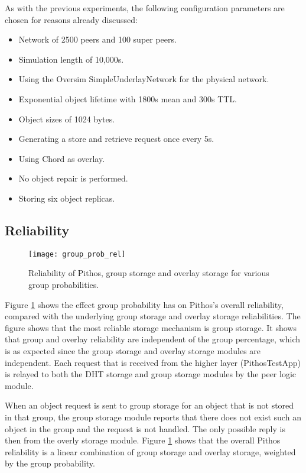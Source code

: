 As with the previous experiments, the following configuration parameters are chosen for reasons already discussed:
%
\begin{itemize}
\item Network of 2500 peers and 100 super peers.
\item Simulation length of 10,000s.
\item Using the Oversim SimpleUnderlayNetwork for the physical network.
\item Exponential object lifetime with 1800s mean and 300s TTL.
\item Object sizes of 1024 bytes.
\item Generating a store and retrieve request once every 5s.
\item Using Chord as overlay.
\item No object repair is performed.
\item Storing six object replicas.
\end{itemize}

\subsection{Reliability}

\begin{figure}[htbp]
 \centering
 \texttt{[image: group\_prob\_rel]}
 \caption{Reliability of Pithos, group storage and overlay storage for various group probabilities.}
 \label{fig_group_prob_rel}
\end{figure}
%
Figure \ref{fig_group_prob_rel} shows the effect group probability has on Pithos's overall reliability, compared with the underlying group storage and overlay storage reliabilities. The figure shows that the most reliable storage mechanism is group storage. It shows that group and overlay reliability are independent of the group percentage, which is as expected since the group storage and overlay storage modules are independent. Each request that is received from the higher layer (PithosTestApp) is relayed to both the DHT storage and group storage modules by the peer logic module.

When an object request is sent to group storage for an object that is not stored in that group, the group storage module reports that there does not exist such an object in the group and the request is not handled. The only possible reply is then from the overly storage module. Figure \ref{fig_group_prob_rel} shows that the overall Pithos reliability is a linear combination of group storage and overlay storage, weighted by the group probability.

